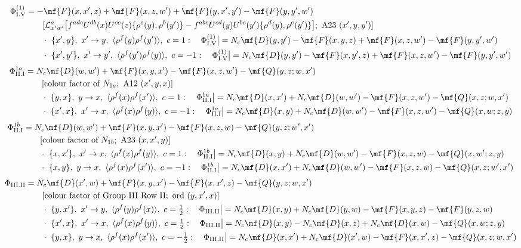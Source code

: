 \begin{align}
\Phi_{\rm I.V}^{(1)}&=-\mf{F}(x,x',z)+\mf{F}(x,z,w')+\mf{F}(y,x',y')-\mf{F}(y,y',w')\notag\\&\qquad[\mathcal{L}^{a}_{x'w'}\big[f^{adc}U^{db}(x)U^{ce}(z)\{\rho^{e}(y),\rho^{b}(y')\}-f^{abc}U^{cd}(y)U^{be}(y')\{\rho^{d}(y),\rho^{e}(y')\}\big];\ \text{A23}\ (x',y,y')]\notag\\
&\qquad\cdot\ \{x',y\},\ x'\to y,\ \langle\rho^{f}(y)\rho^{f}(y')\rangle,\ c=1:\quad \Phi_{\rm I.V}^{(1)}\big|=N_{c}\mf{D}(y,y')-\mf{F}(x,y,z)+\mf{F}(x,z,w')-\mf{F}(y,y',w')\notag\\
&\qquad\cdot\ \{x',y'\},\ x'\to y',\ \langle\rho^{f}(y')\rho^{f}(y)\rangle,\ c=-1:\quad \Phi_{\rm I.V}^{(1)}\big|=N_{c}\mf{D}(y,y')-\mf{F}(x,y',z)+\mf{F}(x,z,w')-\mf{F}(y,y',w')\notag
\end{align}
\begin{align}
\Phi_{\rm II.I}^{1a}&=N_{c}\mf{D}(w,w')+\mf{F}(x,y,x')-\mf{F}(x,z,w')-\mf{Q}(y,z;w,x')\notag\\&\qquad[\text{colour factor of }N_{1a};\ \text{A12}\ (x',y,x)]\notag\\
&\qquad\cdot\ \{y,x\},\ y\to x,\ \langle\rho^{f}(x)\rho^{f}(x')\rangle,\ c=1:\quad \Phi_{\rm II.I}^{1a}\big|=N_{c}\mf{D}(x,x')+N_{c}\mf{D}(w,w')-\mf{F}(x,z,w')-\mf{Q}(x,z;w,x')\notag\\
&\qquad\cdot\ \{x',x\},\ x'\to x,\ \langle\rho^{f}(x)\rho^{f}(y)\rangle,\ c=-1:\quad \Phi_{\rm II.I}^{1a}\big|=N_{c}\mf{D}(x,y)+N_{c}\mf{D}(w,w')-\mf{F}(x,z,w')-\mf{Q}(x,w;z,y)\notag
\end{align}
\begin{align}
\Phi_{\rm II.I}^{1b}&=N_{c}\mf{D}(w,w')+\mf{F}(x,y,x')-\mf{F}(x,z,w)-\mf{Q}(y,z;w',x')\notag\\&\qquad[\text{colour factor of }N_{1b};\ \text{A23}\ (x,x',y)]\notag\\
&\qquad\cdot\ \{x,x'\},\ x'\to x,\ \langle\rho^{f}(x)\rho^{f}(y)\rangle,\ c=1:\quad \Phi_{\rm II.I}^{1b}\big|=N_{c}\mf{D}(x,y)+N_{c}\mf{D}(w,w')-\mf{F}(x,z,w)-\mf{Q}(x,w';z,y)\notag\\
&\qquad\cdot\ \{x,y\},\ y\to x,\ \langle\rho^{f}(x)\rho^{f}(x')\rangle,\ c=-1:\quad \Phi_{\rm II.I}^{1b}\big|=N_{c}\mf{D}(x,x')+N_{c}\mf{D}(w,w')-\mf{F}(x,z,w)-\mf{Q}(x,z;w',x')\notag
\end{align}
\begin{align}
\Phi_{\rm III.II}&=N_{c}\mf{D}(x',w)+\mf{F}(x,y,x')-\mf{F}(x,x',z)-\mf{Q}(y,z;w,x')\notag\\&\qquad[\text{colour factor of Group III Row II};\ \text{ord}\ (y,x',x)]\notag\\
&\qquad\cdot\ \{y,x'\},\ x'\to y,\ \langle\rho^{f}(y)\rho^{f}(x)\rangle,\ c=\tfrac{1}{2}:\quad \Phi_{\rm III.II}\big|=N_{c}\mf{D}(x,y)+N_{c}\mf{D}(y,w)-\mf{F}(x,y,z)-\mf{F}(y,z,w)\notag\\
&\qquad\cdot\ \{x',x\},\ x'\to x,\ \langle\rho^{f}(x)\rho^{f}(y)\rangle,\ c=\tfrac{1}{2}:\quad \Phi_{\rm III.II}\big|=N_{c}\mf{D}(x,y)-N_{c}\mf{D}(x,z)+N_{c}\mf{D}(x,w)-\mf{Q}(x,w;z,y)\notag\\
&\qquad\cdot\ \{y,x\},\ y\to x,\ \langle\rho^{f}(x)\rho^{f}(x')\rangle,\ c=-\tfrac{1}{2}:\quad \Phi_{\rm III.II}\big|=N_{c}\mf{D}(x,x')+N_{c}\mf{D}(x',w)-\mf{F}(x,x',z)-\mf{Q}(x,z;w,x')\notag
\end{align}
